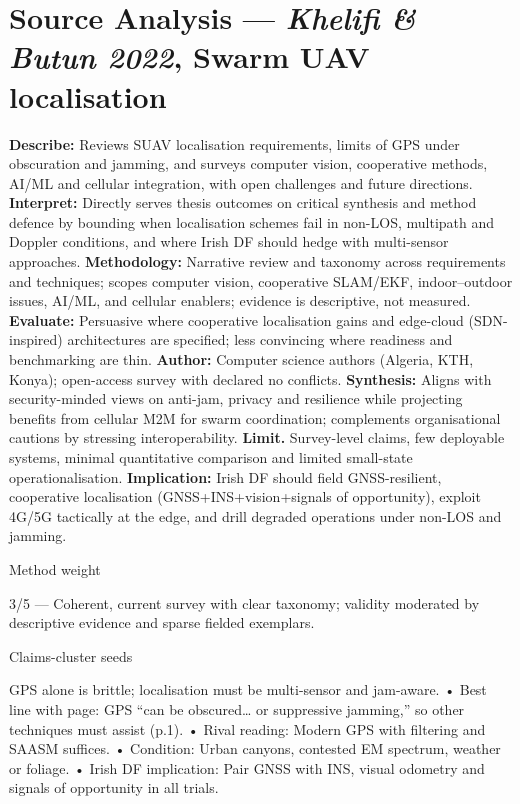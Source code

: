 \section*{Source Analysis — \textit{Khelifi & Butun 2022}, Swarm UAV localisation}
\textbf{Describe:} Reviews SUAV localisation requirements, limits of GPS under obscuration and jamming, and surveys computer vision, cooperative methods, AI/ML and cellular integration, with open challenges and future directions.
\textbf{Interpret:} Directly serves thesis outcomes on critical synthesis and method defence by bounding when localisation schemes fail in non-LOS, multipath and Doppler conditions, and where Irish DF should hedge with multi-sensor approaches.
\textbf{Methodology:} Narrative review and taxonomy across requirements and techniques; scopes computer vision, cooperative SLAM/EKF, indoor–outdoor issues, AI/ML, and cellular enablers; evidence is descriptive, not measured.
\textbf{Evaluate:} Persuasive where cooperative localisation gains and edge-cloud (SDN-inspired) architectures are specified; less convincing where readiness and benchmarking are thin.
\textbf{Author:} Computer science authors (Algeria, KTH, Konya); open-access survey with declared no conflicts.
\textbf{Synthesis:} Aligns with security-minded views on anti-jam, privacy and resilience while projecting benefits from cellular M2M for swarm coordination; complements organisational cautions by stressing interoperability.
\textbf{Limit.} Survey-level claims, few deployable systems, minimal quantitative comparison and limited small-state operationalisation.
\textbf{Implication:} Irish DF should field GNSS-resilient, cooperative localisation (GNSS+INS+vision+signals of opportunity), exploit 4G/5G tactically at the edge, and drill degraded operations under non-LOS and jamming.

Method weight

3/5 — Coherent, current survey with clear taxonomy; validity moderated by descriptive evidence and sparse fielded exemplars.

Claims-cluster seeds

GPS alone is brittle; localisation must be multi-sensor and jam-aware.
• Best line with page: GPS “can be obscured… or suppressive jamming,” so other techniques must assist (p.1).
• Rival reading: Modern GPS with filtering and SAASM suffices.
• Condition: Urban canyons, contested EM spectrum, weather or foliage.
• Irish DF implication: Pair GNSS with INS, visual odometry and signals of opportunity in all trials.

